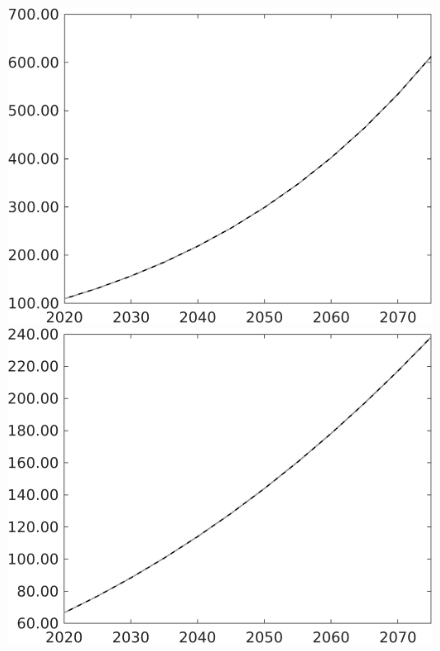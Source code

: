 \documentclass[12pt]{article}
\begin{document}
\begin{figure}[h!!]
\begin{minipage}[]{0.32\textwidth}
	\end{minipage}	
	\begin{minipage}[]{0.32\textwidth}
		\includegraphics[width=1\textwidth]{../../codding_model/own_basedOnFried/optimalPol_010922_revision/figures/all_13Sept22/PerdifNoTauf_regime0_CompTaul_G_spillover0_nsk0_xgr0_knspil1_sep1_LFlimit0_emsbase0_countec0_GovRev0_etaa0.79_lgd0.png}
	\end{minipage}		
	\begin{minipage}[]{0.32\textwidth}
		\includegraphics[width=1\textwidth]{../../codding_model/own_basedOnFried/optimalPol_010922_revision/figures/all_13Sept22/PerdifNoTauf_regime0_CompTaul_pee_spillover0_nsk0_xgr0_knspil1_sep1_LFlimit0_emsbase0_countec0_GovRev0_etaa0.79_lgd0.png}

\end{minipage}
\end{figure}
\end{document}
